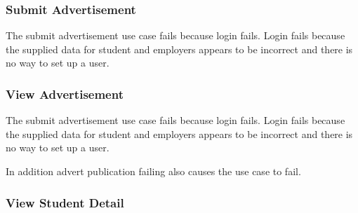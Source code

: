 \documentclass[11pt]{l3deliverable}
\begin{document}
\subsubsection{Submit Advertisement}

The submit advertisement use case fails because login fails. Login fails 
because the supplied data for student and employers appears to be incorrect and 
there is no way to set up a user.

\subsubsection{View Advertisement}

The submit advertisement use case fails because login fails. Login fails 
because the supplied data for student and employers appears to be incorrect and 
there is no way to set up a user.

In addition advert publication failing also causes the use case to fail.

\subsubsection{View Student Detail}
\end{document}
